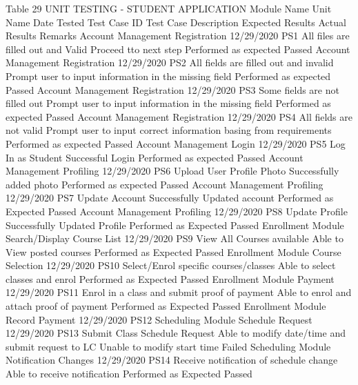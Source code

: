 Table 29
UNIT TESTING - STUDENT APPLICATION
Module Name	Unit Name	Date Tested	Test Case ID	Test Case Description	Expected Results	Actual Results	Remarks
Account Management	Registration 	12/29/2020	PS1	All files are filled out and Valid	Proceed tto next step	Performed as expected	Passed
Account Management	Registration	12/29/2020	PS2	All fields are filled out and invalid	Prompt user to input information in the missing field	Performed as expected	Passed
Account Management	Registration	12/29/2020	PS3	Some fields are not filled out	Prompt user to input information in the missing field	Performed as expected	Passed
Account Management	Registration	12/29/2020	PS4	All fields are not valid	Prompt user to input correct information basing from requirements	Performed as expected	Passed
Account  Management	Login	12/29/2020	PS5	Log In as Student	Successful Login	Performed as expected	Passed
Account Management	Profiling	12/29/2020	PS6 	Upload User Profile Photo	Successfully added photo	Performed as expected	Passed
Account Management	Profiling	12/29/2020	PS7	Update Account	Successfully Updated account	Performed as Expected	Passed
Account Management	Profiling	12/29/2020	PS8	Update Profile	Successfully Updated Profile	Performed as Expected	Passed
Enrollment Module	Search/Display Course List	12/29/2020	PS9	View All Courses available	Able to View posted courses	Performed as Expected	Passed
Enrollment Module	Course Selection	12/29/2020	PS10	Select/Enrol specific courses/classes	Able to select classes and enrol	Performed as Expected	Passed
Enrollment Module	Payment	12/29/2020	PS11	Enrol in a class and submit proof of payment	Able to enrol and attach proof of payment	Performed as Expected	Passed
Enrollment Module	Record Payment	12/29/2020	PS12				
Scheduling Module	Schedule Request	12/29/2020	PS13	Submit Class Schedule Request	Able to modify date/time and submit request to LC	Unable to modify start time	Failed
Scheduling Module	Notification Changes	12/29/2020	PS14	Receive notification of schedule change	Able to receive notification	Performed as Expected	Passed

